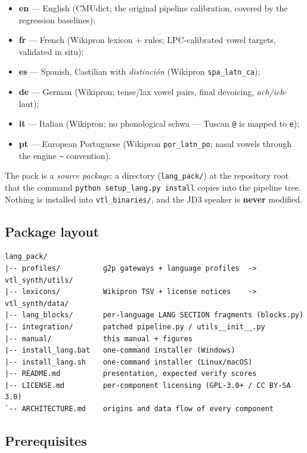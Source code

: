\documentclass[11pt,a4paper]{article}
\newcommand{\code}[1]{\texttt{#1}}
\newcommand{\sampkey}[1]{\texttt{#1}}
\begin{document}
\begin{itemize}
\item \textbf{en} --- English (CMUdict; the original pipeline
      calibration, covered by the regression baselines);
\item \textbf{fr} --- French (Wikipron lexicon + rules; LPC-calibrated
      vowel targets, validated in situ);
\item \textbf{es} --- Spanish, Castilian with \emph{distinci\'on}
      (Wikipron \code{spa\_latn\_ca});
\item \textbf{de} --- German (Wikipron; tense/lax vowel pairs,
      final devoicing, \emph{ach/ich}-laut);
\item \textbf{it} --- Italian (Wikipron; no phonological schwa ---
      Tuscan \code{@} is mapped to \sampkey{e});
\item \textbf{pt} --- European Portuguese (Wikipron
      \code{por\_latn\_po}; nasal vowels through the engine
      \sampkey{\textasciitilde} convention).
\end{itemize}

The pack is a \emph{source package}: a directory
(\code{lang\_pack/}) at the repository root that the command
\code{python setup\_lang.py install} copies into the pipeline tree.
Nothing is installed into \code{vtl\_binaries/}, and the JD3 speaker
is \textbf{never} modified.

\subsection{Package layout}

{\small
\begin{verbatim}
lang_pack/
|-- profiles/          g2p gateways + language profiles  -> vtl_synth/utils/
|-- lexicons/          Wikipron TSV + license notices    -> vtl_synth/data/
|-- lang_blocks/       per-language LANG SECTION fragments (blocks.py)
|-- integration/       patched pipeline.py / utils__init__.py
|-- manual/            this manual + figures
|-- install_lang.bat   one-command installer (Windows)
|-- install_lang.sh    one-command installer (Linux/macOS)
|-- README.md          presentation, expected verify scores
|-- LICENSE.md         per-component licensing (GPL-3.0+ / CC BY-SA 3.0)
`-- ARCHITECTURE.md    origins and data flow of every component
\end{verbatim}
}

\subsection{Prerequisites}
\end{document}
